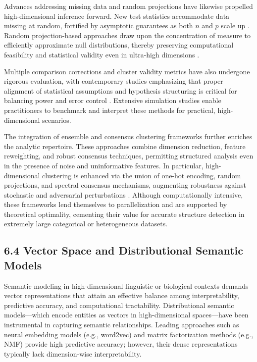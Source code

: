 \documentclass[11pt]{article}
\begin{document}
Advances addressing missing data and random projections have likewise propelled high-dimensional inference forward. New test statistics accommodate data missing at random, fortified by asymptotic guarantees as both $n$ and $p$ scale up \cite{ref94}. Random projection-based approaches draw upon the concentration of measure to efficiently approximate null distributions, thereby preserving computational feasibility and statistical validity even in ultra-high dimensions \cite{ref92, ref93}.

Multiple comparison corrections and cluster validity metrics have also undergone rigorous evaluation, with contemporary studies emphasizing that proper alignment of statistical assumptions and hypothesis structuring is critical for balancing power and error control \cite{ref95, ref110, ref113}. Extensive simulation studies enable practitioners to benchmark and interpret these methods for practical, high-dimensional scenarios.

The integration of ensemble and consensus clustering frameworks further enriches the analytic repertoire. These approaches combine dimension reduction, feature reweighting, and robust consensus techniques, permitting structured analysis even in the presence of noise and uninformative features. In particular, high-dimensional clustering is enhanced via the union of one-hot encoding, random projections, and spectral consensus mechanisms, augmenting robustness against stochastic and adversarial perturbations \cite{ref92, ref95}. Although computationally intensive, these frameworks lend themselves to parallelization and are supported by theoretical optimality, cementing their value for accurate structure detection in extremely large categorical or heterogeneous datasets.

\subsection{6.4 Vector Space and Distributional Semantic Models}

Semantic modeling in high-dimensional linguistic or biological contexts demands vector representations that attain an effective balance among interpretability, predictive accuracy, and computational tractability. Distributional semantic models—which encode entities as vectors in high-dimensional spaces—have been instrumental in capturing semantic relationships. Leading approaches such as neural embedding models (e.g., word2vec) and matrix factorization methods (e.g., NMF) provide high predictive accuracy; however, their dense representations typically lack dimension-wise interpretability.
\end{document}
